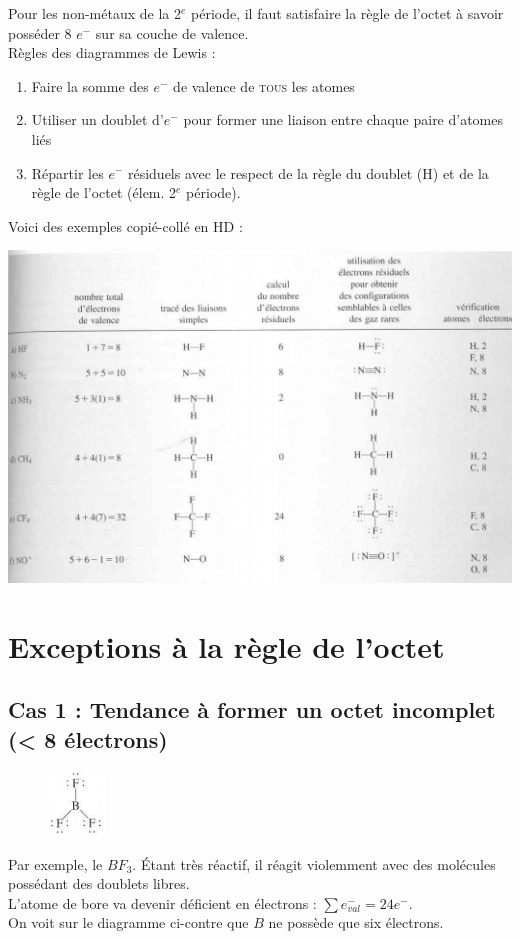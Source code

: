 \documentclass	[11pt, a4paper, openany]{book}
\begin{document}
Pour les non-métaux de la 2$^e$ période, il faut satisfaire la règle de l'octet à savoir posséder 8 $e^-$ sur sa couche de valence.\\
Règles des diagrammes de Lewis :
\begin{enumerate}
	\item Faire la somme des $e^-$ de valence de \textsc{tous} les atomes
	\item Utiliser un doublet d'$e^-$ pour former une liaison entre chaque paire d'atomes liés
	\item Répartir les $e^-$ résiduels avec le respect de la règle du doublet (H) et de la règle de l'octet (élem. 2$^e$ période).
\end{enumerate}
Voici des exemples copié-collé en HD : 
\begin{center}
	\includegraphics[scale=0.85]{image7.png}\\
\end{center}

\section{Exceptions à la règle de l'octet}
\subsection{Cas 1 :  Tendance à former un octet incomplet (< 8 électrons)}
\begin{figure}
	\includegraphics[width=1.5cm]{image8.png}
\end{figure}
Par exemple, le $BF_3$. Étant très réactif, il réagit violemment avec des molécules possédant des doublets libres.\\
L'atome de bore va devenir déficient en électrons : $\sum e^-_{val} = 24 e^-$.\\
On voit sur le diagramme ci-contre que $B$ ne possède que six électrons.
\end{document}
